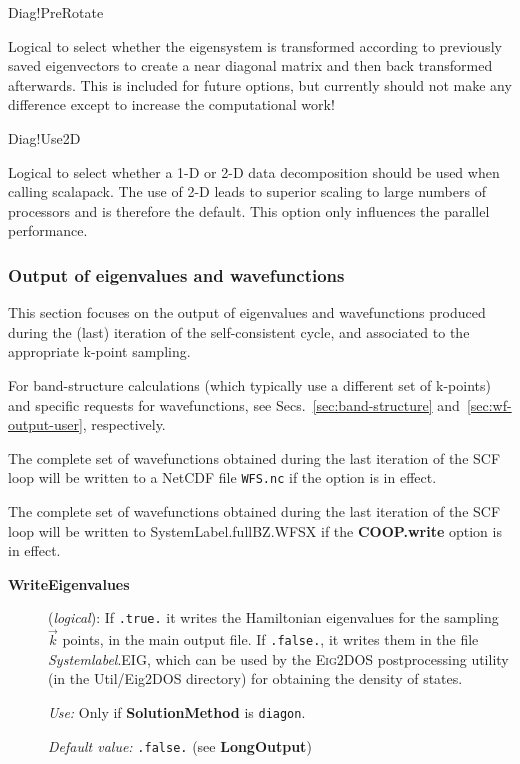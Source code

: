 \begin{fdflogicalF}{Diag!PreRotate}

  Logical to select whether the eigensystem is transformed according
  to previously saved eigenvectors to create a near diagonal matrix
  and then back transformed afterwards. This is included for future
  options, but currently should not make any difference except to
  increase the computational work!
  
\end{fdflogicalF}


\begin{fdflogicalT}{Diag!Use2D}

  Logical to select whether a 1-D or 2-D data decomposition should be
  used when calling scalapack. The use of 2-D leads to superior
  scaling to large numbers of processors and is therefore the
  default. This option only influences the parallel performance.
  
\end{fdflogicalT}


\subsubsection{Output of eigenvalues and wavefunctions}

This section focuses on the output of eigenvalues and wavefunctions
produced during the (last) iteration of the self-consistent cycle,
and associated to the appropriate k-point sampling.

For band-structure calculations (which typically use a different set
of k-points) and specific requests for wavefunctions, see
Secs.~\ref{sec:band-structure} and~\ref{sec:wf-output-user}, respectively.

The complete set of wavefunctions obtained during the last
iteration of the SCF loop will be written to a NetCDF file
\texttt{WFS.nc} if the  option is in effect.

The complete set of wavefunctions obtained during the last
iteration of the SCF loop will be written to SystemLabel.fullBZ.WFSX
if the \textbf{COOP.write} option is in effect.

\begin{description}
\item[\textbf{WriteEigenvalues}] (\textit{logical}):
If \texttt{.true.} it writes the Hamiltonian eigenvalues for the sampling
$\vec k$ points, in the main output file.
If \texttt{.false.}, it writes them in the file \textit{Systemlabel}.EIG,
which can be used by the \textsc{Eig2DOS} postprocessing
utility (in the Util/Eig2DOS directory) for obtaining the density of
states.

\textit{Use:} Only if \textbf{SolutionMethod} is \texttt{diagon}.

\textit{Default value:} \texttt{.false.} (see \textbf{LongOutput})

\end{description}

